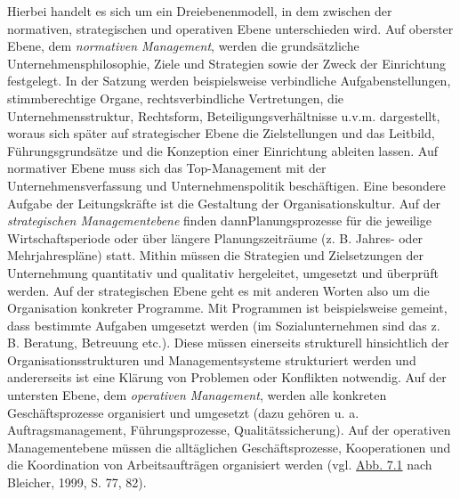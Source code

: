\documentclass[
  letterpaper,
]{book}
\begin{document}
Hierbei handelt es sich um ein Dreiebenenmodell, in dem zwischen der
normativen, strategischen und operativen Ebene unterschieden wird. Auf
oberster Ebene, dem \emph{normativen Management}, werden die
grundsätzliche Unternehmensphilosophie, Ziele und Strategien sowie der
Zweck der Einrichtung festgelegt. In der Satzung werden beispielsweise
verbindliche Aufgabenstellungen, stimmberechtige Organe,
rechtsverbindliche Vertretungen, die Unternehmensstruktur, Rechtsform,
Beteiligungsverhältnisse u.v.m. dargestellt, woraus sich später auf
strategischer Ebene die Zielstellungen und das Leitbild,
Führungsgrundsätze und die Konzeption einer Einrichtung ableiten lassen.
Auf normativer Ebene muss sich das Top-Management mit der
Unternehmensverfassung und Unternehmenspolitik beschäftigen. Eine
besondere Aufgabe der Leitungskräfte ist die Gestaltung der
Organisationskultur. Auf der \emph{strategischen Managementebene} finden
dannPlanungsprozesse für die jeweilige Wirtschaftsperiode oder über
längere Planungszeiträume (z. B. Jahres- oder Mehrjahrespläne) statt.
Mithin müssen die Strategien und Zielsetzungen der Unternehmung
quantitativ und qualitativ hergeleitet, umgesetzt und überprüft werden.
Auf der strategischen Ebene geht es mit anderen Worten also um die
Organisation konkreter Programme. Mit Programmen ist beispielsweise
gemeint, dass bestimmte Aufgaben umgesetzt werden (im Sozialunternehmen
sind das z. B. Beratung, Betreuung etc.). Diese müssen einerseits
strukturell hinsichtlich der Organisationsstrukturen und
Managementsysteme strukturiert werden und andererseits ist eine Klärung
von Problemen oder Konflikten notwendig. Auf der untersten Ebene, dem
\emph{operativen Management}, werden alle konkreten Geschäftsprozesse
organisiert und umgesetzt (dazu gehören u. a. Auftragsmanagement,
Führungsprozesse, Qualitätssicherung). Auf der operativen
Managementebene müssen die alltäglichen Geschäftsprozesse, Kooperationen
und die Koordination von Arbeitsaufträgen organisiert werden (vgl.
\hyperref[figure71]{Abb. 7.1} nach Bleicher, 1999, S. 77, 82).
\end{document}
